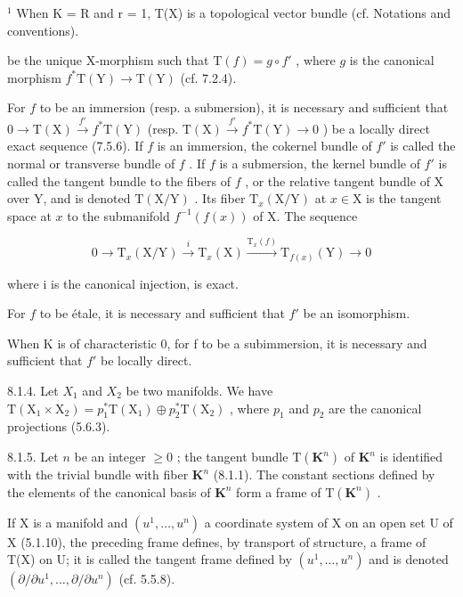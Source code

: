 \(^{1}\) When K = R and r = 1, T(X) is a topological vector bundle (cf. Notations and conventions).

be the unique X-morphism such that \(\mathrm{T}(f) = g \circ f'\) , where \(g\) is the canonical morphism \(f^{*}\mathrm{T}(\mathrm{Y}) \to \mathrm{T}(\mathrm{Y})\) (cf. 7.2.4).

For \(f\) to be an immersion (resp. a submersion), it is necessary and sufficient that \(0 \to \mathrm{T}(\mathrm{X}) \xrightarrow{f'} f^* \mathrm{T}(\mathrm{Y})\) (resp. \(\mathrm{T}(\mathrm{X}) \xrightarrow{f'} f^* \mathrm{T}(\mathrm{Y}) \to 0\) ) be a locally direct exact sequence (7.5.6). If \(f\) is an immersion, the cokernel bundle of \(f'\) is called the normal or transverse bundle of \(f\) . If \(f\) is a submersion, the kernel bundle of \(f'\) is called the tangent bundle to the fibers of \(f\) , or the relative tangent bundle of X over Y, and is denoted \(\mathrm{T}(\mathrm{X}/\mathrm{Y})\) . Its fiber \(\mathrm{T}_x(\mathrm{X}/\mathrm{Y})\) at \(x \in \mathrm{X}\) is the tangent space at \(x\) to the submanifold \(f^{-1}(f(x))\) of X. The sequence

\[
0 \longrightarrow \mathrm{T} _ {x} (\mathrm{X} / \mathrm{Y}) \stackrel {i} {\longrightarrow} \mathrm{T} _ {x} (\mathrm{X}) \stackrel {\mathrm{T} _ {x} (f)} {\longrightarrow} \mathrm{T} _ {f (x)} (\mathrm{Y}) \longrightarrow 0
\]

where i is the canonical injection, is exact.

For \(f\) to be étale, it is necessary and sufficient that \(f'\) be an isomorphism.

When K is of characteristic 0, for f to be a subimmersion, it is necessary and sufficient that \(f'\) be locally direct.

8.1.4. Let \(X_{1}\) and \(X_{2}\) be two manifolds. We have \(\mathrm{T}(\mathrm{X}_{1} \times \mathrm{X}_{2}) = p_{1}^{*}\mathrm{T}(\mathrm{X}_{1}) \oplus p_{2}^{*}\mathrm{T}(\mathrm{X}_{2})\) , where \(p_{1}\) and \(p_{2}\) are the canonical projections (5.6.3).

8.1.5. Let \(n\) be an integer \(\geqslant 0\) ; the tangent bundle \(\mathrm{T}(\mathbf{K}^{n})\) of \(\mathbf{K}^{n}\) is identified with the trivial bundle with fiber \(\mathbf{K}^{n}\) (8.1.1). The constant sections defined by the elements of the canonical basis of \(\mathbf{K}^{n}\) form a frame of \(\mathrm{T}(\mathbf{K}^{n})\) .

If X is a manifold and \((u^{1},\ldots,u^{n})\) a coordinate system of X on an open set U of X (5.1.10), the preceding frame defines, by transport of structure, a frame of T(X) on U; it is called the tangent frame defined by \((u^{1},\ldots,u^{n})\) and is denoted \((\partial/\partial u^{1},\ldots,\partial/\partial u^{n})\) (cf. 5.5.8).


